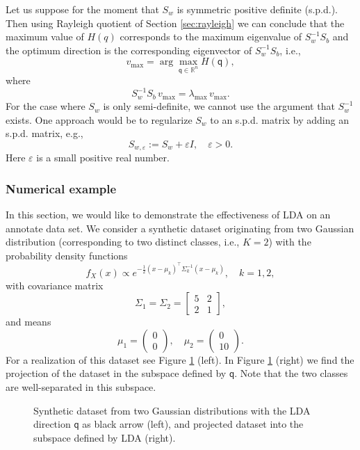 \documentclass[11pt]{article}
\newcommand{\R}{\mathbb{R}}
\newcommand{\q}{\textsf{q}}
\newcommand{\Arr}[2]{
	\left(
		\begin{array}{c}
		{#1} 
		\\
		{#2}
		\end{array}
	\right)
}
\newcommand{\MATT}[4]{
	\left[
		\begin{array}{cc}
		{#1} 
		&
		{#2}
		\\
		{#3} 
		&
		{#4}		
		\end{array}
	\right]
}
\begin{document}
Let us suppose for the moment that $S_w$ is symmetric positive
definite (s.p.d.). Then using Rayleigh quotient of Section
\ref{sec:rayleigh} we can conclude that the maximum value of $H(q)$
corresponds to the maximum eigenvalue of $S_w^{-1} S_b$ and the
optimum direction is the corresponding eigenvector of $S_w^{-1} S_b$,
i.e.,
\begin{equation}
  v_{\max} = \arg \max_{\q\in \R^{n}} H(\q),
\end{equation}
where
\begin{equation}
  S_w^{-1} S_b \, v_{\max} = \lambda_{\max} \, v_{\max}.
\end{equation}
For the case where $S_w$ is only semi-definite, we cannot use the
argument that $S_w^{-1}$ exists. One approach would be to regularize
$S_w$ to an s.p.d. matrix by adding an s.p.d. matrix, e.g.,
\begin{equation}
  S_{w,\varepsilon} := S_w + \varepsilon I, \quad \varepsilon >
  0.
\end{equation}
Here $\varepsilon$ is a small positive real number.
\subsubsection{Numerical example}
In this section, we would like to demonstrate the effectiveness of LDA on an annotate data set. We consider a synthetic dataset originating from two Gaussian distribution (corresponding to two distinct classes, i.e., $K=2$) with the probability density functions 
\begin{equation}
	f_X(x) \propto e^{-\frac12 (x - \mu_{k}^{})^\top 
	\Sigma^{-1}_{k} (x - \mu_{k}^{})}, \quad k = 1, 2,
\end{equation}
with covariance matrix
\begin{equation}
	\Sigma_1 = \Sigma_2 = 
	\MATT{5}{2}{2}{1},
\end{equation}
and means
\begin{equation}
	\mu_1 = \Arr{0}{0}, \quad \mu_2 = \Arr{0}{10}.
\end{equation}
For a realization of this dataset see Figure \ref{fig:synthetic-data-lda} (left). In Figure \ref{fig:synthetic-data-lda} (right) we find the projection of the dataset in the subspace defined by $\q$. Note that the two classes are well-separated in this subspace.
\begin{figure}
    \begin{center}
        \scalebox{0.6}{}
        \scalebox{0.6}{}
    \end{center}
    \caption{Synthetic dataset from two Gaussian distributions with the LDA direction $\q$ as black arrow (left), and projected dataset into the subspace defined by LDA (right).}
    \label{fig:synthetic-data-lda}
\end{figure}
\end{document}

